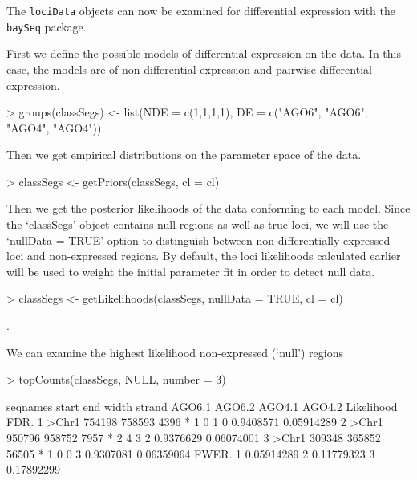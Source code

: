 \documentclass[a4paper]{article}
\begin{document}
The \verb'lociData' objects can now be examined for differential expression with the \verb'baySeq' package.

First we define the possible models of differential expression on the data. In this case, the models are of non-differential expression and pairwise differential expression.
\begin{Schunk}
\begin{Sinput}
> groups(classSegs) <- list(NDE = c(1,1,1,1), DE = c("AGO6", "AGO6", "AGO4", "AGO4"))
\end{Sinput}
\end{Schunk}

Then we get empirical distributions on the parameter space of the data.
\begin{Schunk}
\begin{Sinput}
> classSegs <- getPriors(classSegs, cl = cl)
\end{Sinput}
\end{Schunk}

Then we get the posterior likelihoods of the data conforming to each model. Since the `classSegs' object contains null regions as well as true loci, we will use the `nullData = TRUE' option to distinguish between non-differentially expressed loci and non-expressed regions. By default, the loci likelihoods calculated earlier will be used to weight the initial parameter fit in order to detect null data.
\begin{Schunk}
\begin{Sinput}
> classSegs <- getLikelihoods(classSegs, nullData = TRUE, cl = cl)
\end{Sinput}
\begin{Soutput}
.
\end{Soutput}
\end{Schunk}

We can examine the highest likelihood non-expressed (`null') regions

\begin{Schunk}
\begin{Sinput}
> topCounts(classSegs, NULL, number = 3)
\end{Sinput}
\begin{Soutput}
  seqnames  start    end width strand AGO6.1 AGO6.2 AGO4.1 AGO4.2 Likelihood       FDR.
1    >Chr1 754198 758593  4396      *      1      0      1      0  0.9408571 0.05914289
2    >Chr1 950796 958752  7957      *      2      4      3      2  0.9376629 0.06074001
3    >Chr1 309348 365852 56505      *      1      0      0      3  0.9307081 0.06359064
       FWER.
1 0.05914289
2 0.11779323
3 0.17892299
\end{Soutput}
\end{Schunk}
\end{document}
